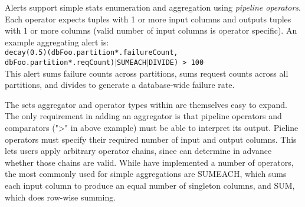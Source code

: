 Alerts support simple stats enumeration and aggregation using 
\emph{pipeline operators}.
Each operator expects tuples with 1 or more 
input columns and outputs tuples with 1 or more columns (valid number of input columns is
operator specific).  
An example aggregating alert is: \\
\texttt{decay(0.5)(dbFoo.partition*.failureCount, \\
dbFoo.partition*.reqCount)$|$SUMEACH$|$DIVIDE) > 100} \\
This alert sums failure counts across partitions, sums request counts
across all partitions, and divides to generate a
database-wide failure rate.

The sets aggregator and operator types within \helix are themselves easy to
expand.  The only requirement in adding an aggregator is that pipeline operators
and comparators (">" in above example) must be able to interpret its output.
Pieline operators must specify their required number of input and output columns.  This
lets users apply arbitrary operator chains, since \helix can determine in
advance whether those chains are valid.  While have implemented a number of
operators, the most commonly used for simple aggregations are SUMEACH, which
sums each input column to produce an equal number of singleton columns, and SUM,
which does row-wise summing. 

